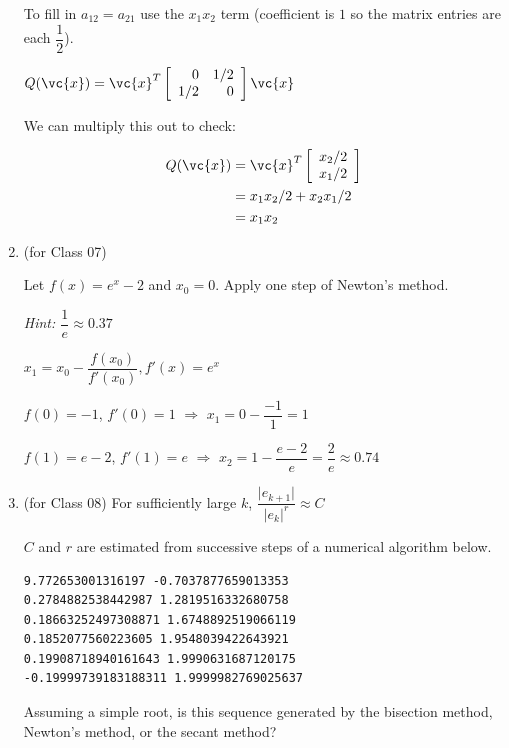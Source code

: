 \documentclass[12pt,letterpaper,answers]{exam}
\begin{document}
\begin{enumerate}
\begin{solution}
To fill in $a_{12} = a_{21}$ use the $x_1x_2$ term (coefficient is $1$ so the matrix entries are each $\dfrac{1}{2}$).


$Q(\vc{x}) = \vc{x}^T\left[\begin{array}{r r} 
0 & 1/2 \\
1/2 & 0
\end{array}\right] \vc{x}$

We can multiply this out to check:

\begin{align*}
    Q(\vc{x}) &= \vc{x}^T\left[\begin{array}{c}
x_2/2 \\
x_1/2
\end{array}
\right] \\
&= x_1x_2/2 + x_2x_1/2 \\
&= x_1x_2
\end{align*}
\end{solution}

\item (for Class 07)

Let $f(x) = e^x - 2$ and $x_0 = 0$.  Apply one step of Newton's method.

\emph{Hint: $\dfrac{1}{e}\approx0.37$}

\begin{solution}
$x_1 = x_0 - \dfrac{f(x_0)}{f'(x_0)}, f'(x) = e^x$  

$f(0) = -1$, $f'(0) = 1$ $\Longrightarrow$  $x_1 = 0 - \dfrac{-1}{1} = 1$

$f(1) = e-2$, $f'(1) = e$ $\Longrightarrow$  $x_2 = 1 - \dfrac{e-2}{e} = \dfrac{2}{e} \approx0.74$
\end{solution}

\item (for Class 08) For sufficiently large $k$, $\dfrac{\vert e_{k+1}\vert}{\vert e_k\vert^r} \approx C$


$C$ and $r$ are estimated from successive steps of a numerical algorithm below.

\begin{verbatim}
9.772653001316197 -0.7037877659013353
0.2784882538442987 1.2819516332680758
0.18663252497308871 1.6748892519066119
0.1852077560223605 1.9548039422643921
0.19908718940161643 1.9990631687120175
-0.19999739183188311 1.9999982769025637
\end{verbatim}

Assuming a simple root, is this sequence generated by the bisection method, Newton's method, or the secant method?


\end{enumerate}
\end{document}
